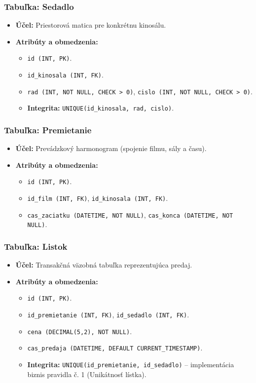 \documentclass[11pt, a4paper]{article}
\begin{document}
\subsubsection{Tabuľka: Sedadlo}
\begin{itemize}
    \item \textbf{Účel:} Priestorová matica pre konkrétnu kinosálu.
    \item \textbf{Atribúty a obmedzenia:}
    \begin{itemize}
        \item \texttt{id (INT, PK)}.
        \item \texttt{id\_kinosala (INT, FK)}.
        \item \texttt{rad (INT, NOT NULL, CHECK > 0)}, \texttt{cislo (INT, NOT NULL, CHECK > 0)}.
        \item \textbf{Integrita:} \texttt{UNIQUE(id\_kinosala, rad, cislo)}.
    \end{itemize}
\end{itemize}

\subsubsection{Tabuľka: Premietanie}
\begin{itemize}
    \item \textbf{Účel:} Prevádzkový harmonogram (spojenie filmu, sály a času).
    \item \textbf{Atribúty a obmedzenia:}
    \begin{itemize}
        \item \texttt{id (INT, PK)}.
        \item \texttt{id\_film (INT, FK)}, \texttt{id\_kinosala (INT, FK)}.
        \item \texttt{cas\_zaciatku (DATETIME, NOT NULL)}, \texttt{cas\_konca (DATETIME, NOT NULL)}.
    \end{itemize}
\end{itemize}

\subsubsection{Tabuľka: Listok}
\begin{itemize}
    \item \textbf{Účel:} Transakčná väzobná tabuľka reprezentujúca predaj.
    \item \textbf{Atribúty a obmedzenia:}
    \begin{itemize}
        \item \texttt{id (INT, PK)}.
        \item \texttt{id\_premietanie (INT, FK)}, \texttt{id\_sedadlo (INT, FK)}.
        \item \texttt{cena (DECIMAL(5,2), NOT NULL)}.
        \item \texttt{cas\_predaja (DATETIME, DEFAULT CURRENT\_TIMESTAMP)}.
        \item \textbf{Integrita:} \texttt{UNIQUE(id\_premietanie, id\_sedadlo)} – implementácia biznis pravidla č. 1 (Unikátnosť lístka).
    \end{itemize}
\end{itemize}
\end{document}
